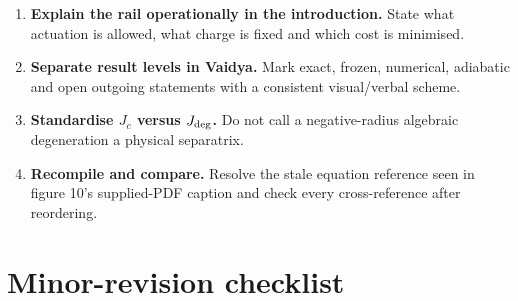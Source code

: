 \documentclass[11pt,a4paper]{article}
\begin{document}
\begin{enumerate}[label=\textbf{M\arabic*.}]
  and avoid implying an unconditional global minimisation theorem.
  \item \textbf{Explain the rail operationally in the introduction.}  State what actuation is
  allowed, what charge is fixed and which cost is minimised.
  \item \textbf{Separate result levels in Vaidya.}  Mark exact, frozen, numerical, adiabatic and open
  outgoing statements with a consistent visual/verbal scheme.
  \item \textbf{Standardise $J_c$ versus $J_{\rm deg}$.}  Do not call a negative-radius algebraic
  degeneration a physical separatrix.
  \item \textbf{Recompile and compare.}  Resolve the stale equation reference seen in figure 10's
  supplied-PDF caption and check every cross-reference after reordering.
\end{enumerate}

\section{Minor-revision checklist}
\end{document}
